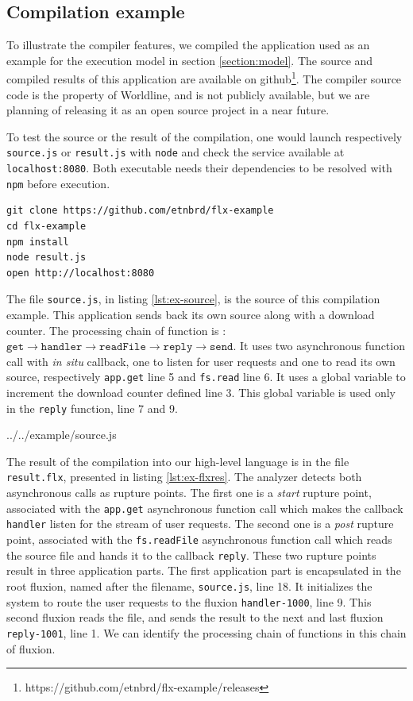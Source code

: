 \subsection{Compilation example} \label{section:example}

To illustrate the compiler features, we compiled the application used as an example for the execution model in section \ref{section:model}.
The source and compiled results of this application are available on github\cite{flx-example}\footnote{\raggedright https://github.com/etnbrd/flx-example/releases}.
The compiler source code is the property of Worldline, and is not publicly available, but we are planning of releasing it as an open source project in a near future.

To test the source or the result of the compilation, one would launch respectively \texttt{source.js} or \texttt{result.js} with \texttt{node} and check the service available at \texttt{localhost:8080}.
Both executable needs their dependencies to be resolved with \texttt{npm} before execution.
\begin{verbatim}
git clone https://github.com/etnbrd/flx-example
cd flx-example
npm install
node result.js
open http://localhost:8080
\end{verbatim}

The file \texttt{source.js}, in listing \ref{lst:ex-source}, is the source of this compilation example.
This application sends back its own source along with a download counter.
The processing chain of function is : $\texttt{get} \to \texttt{handler} \to \texttt{readFile} \to \texttt{reply} \to \texttt{send}$.
It uses two asynchronous function call with \textit{in situ} callback, one to listen for user requests and one to read its own source, respectively \texttt{app.get} line 5 and \texttt{fs.read} line 6.
It uses a global variable to increment the download counter defined line 3.
This global variable is used only in the \texttt{reply} function, line 7 and 9.

{../../example/source.js}

The result of the compilation into our high-level language is in the file \texttt{result.flx}, presented in listing \ref{lst:ex-flxres}.
The analyzer detects both asynchronous calls as rupture points.
The first one is a \textit{start} rupture point, associated with the \texttt{app.get} asynchronous function call which makes the callback \texttt{handler} listen for the stream of user requests. 
The second one is a \textit{post} rupture point, associated with the \texttt{fs.readFile} asynchronous function call which reads the source file and hands it to the callback \texttt{reply}.
These two rupture points result in three application parts.
The first application part is encapsulated in the root fluxion, named after the filename, \texttt{source.js}, line 18.
It initializes the system to route the user requests to the fluxion \texttt{handler-1000}, line 9.
This second fluxion reads the file, and sends the result to the next and last fluxion \texttt{reply-1001}, line 1.
We can identify the processing chain of functions in this chain of fluxion.


